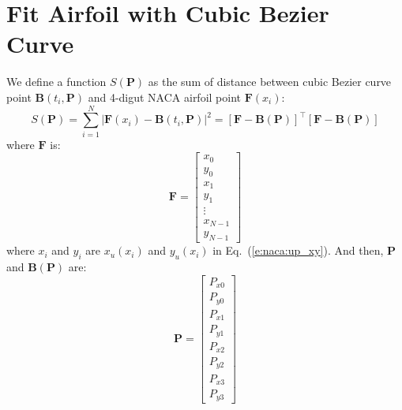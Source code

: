 

\chapter{Fit Airfoil with Cubic Bezier Curve}


We define a function $S(\mathbf{P})$ as the sum of distance between cubic Bezier curve point
$\mathbf{B}(t_i, \mathbf{P})$ and 4-digut NACA airfoil point $\mathbf{F}(x_i)$:
\begin{equation*}
    S(\mathbf{P}) = \sum_{i=1}^N \left| \mathbf{F}(x_i) - \mathbf{B}(t_i, \mathbf{P}) \right|^2 =
    \left[ \mathbf{F} - \mathbf{B}(\mathbf{P}) \right]^\top \left[ \mathbf{F} - \mathbf{B}(\mathbf{P}) \right]
\end{equation*}
where $\mathbf{F}$ is:
\begin{equation*}
    \mathbf{F} =
    \begin{bmatrix}
        x_0 \\ y_0 \\ x_1 \\ y_1 \\ \vdots \\ x_{N-1} \\ y_{N-1}
    \end{bmatrix}
\end{equation*}
where $x_i$ and $y_i$ are $x_u(x_i)$ and $y_u(x_i)$ in Eq.~(\ref{e:naca:up_xy}). And then, $\mathbf{P}$ and
$\mathbf{B}(\mathbf{P})$ are:
\begin{equation*}
    \mathbf{P} =
    \begin{bmatrix}
        P_{x0} \\ P_{y0} \\ P_{x1} \\ P_{y1} \\ P_{x2} \\ P_{y2} \\ P_{x3} \\ P_{y3}
    \end{bmatrix}
\end{equation*}
